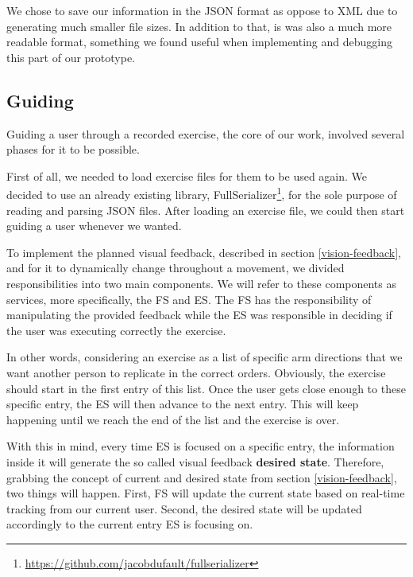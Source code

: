 We chose to save our information in the JSON format as oppose to XML due to generating much smaller file sizes. In addition to that, is was also a much more readable format, something we found useful when implementing and debugging this part of our prototype.

\subsection{Guiding}


Guiding a user through a recorded exercise, the core of our work, involved several phases for it to be possible.

First of all, we needed to load exercise files for them to be used again. 
We decided to use an already existing library, FullSerializer\footnote{\url{https://github.com/jacobdufault/fullserializer}}, for the sole purpose of reading and parsing JSON files.
After loading an exercise file, we could then start guiding a user whenever we wanted.

To implement the planned visual feedback, described in section \ref{vision-feedback}, and for it to dynamically change throughout a movement, 
we divided responsibilities into two main components. We will refer to these components as services, more specifically, the \ac{FS} and \ac{ES}.
The \ac{FS} has the responsibility of manipulating the provided feedback while the \ac{ES} was responsible in deciding if the user was executing correctly the exercise.

In other words, considering an exercise as a list of specific arm directions that we want another person to replicate in the correct orders. 
Obviously, the exercise should start in the first entry of this list. 
Once the user gets close enough to these specific entry, the \ac{ES} will then advance to the next entry. 
This will keep happening until we reach the end of the list and the exercise is over.

With this in mind, every time \ac{ES} is focused on a specific entry, the information inside it will generate the so called visual feedback \textbf{desired state}. 
Therefore, grabbing the concept of current and desired state from section \ref{vision-feedback}, two things will happen. 
First, \ac{FS} will update the current state based on real-time tracking from our current user. 
Second, the desired state will be updated accordingly to the current entry \ac{ES} is focusing on.


